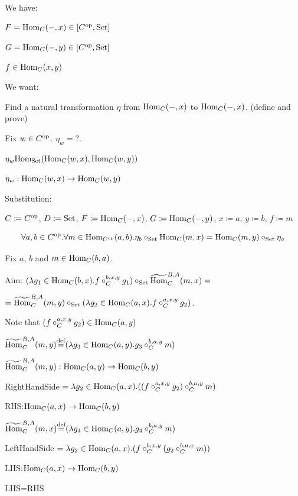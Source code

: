 \documentclass[10pt,a4paper]{article}
\begin{document}
\begin{Lemma}$\textrm{ }$

We have:

$F={\textrm{Hom}}_C(-,x)\in [C^{\textrm{op}},{\textrm{Set}}]$

$G={\textrm{Hom}}_C(-,y)\in [C^{\textrm{op}},{\textrm{Set}}]$

$f\in{\textrm{Hom}}_C(x,y)$

We want:

Find a natural transformation $\eta$ from ${\textrm{Hom}}_C(-,x)$ to ${\textrm{Hom}}_C(-,x)$.
 (define and prove)

\end{Lemma}
Fix $w\in C^{\textrm{op}}$. $\eta_w = ?$.

$\eta_w{\textrm{Hom}}_{\textrm{Set}}({\textrm{Hom}}_C(w,x),{\textrm{Hom}}_C(w,y))$

$\eta_w: {\textrm{Hom}}_C(w,x)\to {\textrm{Hom}}_C(w,y)$


Substitution:

$C \coloneqq C^{\textrm{op}}$, $D \coloneqq {\textrm{Set}}$, $F \coloneqq {\textrm{Hom}}_C(-,x)$, $G \coloneqq {\textrm{Hom}}_C(-,y)$, $x \coloneqq a$, $y \coloneqq b$, $f \coloneqq m$
\begin{Lemma}
$$\forall a,b\in C^{\textrm{op}}. \forall m\in {\textrm{Hom}}_{C^{\textrm{op}}}(a,b).\eta_b \circ_{\textrm{Set}} {\textrm{Hom}}_C(m,x)={\textrm{Hom}}_C(m,y)\circ_{\textrm{Set}}\eta_a$$
\end{Lemma}
\myprf

Fix $a$, $b$ and $m\in{\textrm{Hom}}_C(b,a)$.

Aim: $(\lambda g_1 \in {\textrm{Hom}}_C(b,x). f\circ^{b,x,y}_C g_1)\circ_{\textrm{Set}} {\widetilde{{\textrm{Hom}}}\textrm{}}_C^{B,A}(m,x) = $

$={\widetilde{{\textrm{Hom}}}\textrm{}}_C^{B,A}(m,y) \circ_{\textrm{Set}} (\lambda g_2 \in {\textrm{Hom}}_C(a,x). f\circ^{a,x,y}_C g_2)$.

Note that $(f\circ^{a,x,y}_C g_2) \in {\textrm{Hom}}_C(a,y)$

${\widetilde{{\textrm{Hom}}}\textrm{}}_C^{B,A}(m,y) {\stackrel{{\textrm{def}}}{=}} (\lambda g_3 \in {\textrm{Hom}}_C(a,y). g_3\circ^{b,a,y}_C m)$

${\widetilde{{\textrm{Hom}}}\textrm{}}_C^{B,A}(m,y) : {\textrm{Hom}}_C(a,y) \to {\textrm{Hom}}_C(b,y)$

RightHandSide $= \lambda g_2 \in {\textrm{Hom}}_C(a,x). ((f \circ_C^{a,x,y} g_2) \circ_C^{b,a,y} m )$

RHS:${\textrm{Hom}}_C(a,x) \to {\textrm{Hom}}_C(b,y)$

${\widetilde{{\textrm{Hom}}}\textrm{}}_C^{B,A}(m,x) {\stackrel{{\textrm{def}}}{=}} (\lambda g_4 \in {\textrm{Hom}}_C(a,y). g_4\circ^{b,a,y}_C m)$

LeftHandSide $= \lambda g_2 \in {\textrm{Hom}}_C(a,x). (f \circ_C^{b,x,y} (g_2 \circ_C^{b,a,x} m ))$

LHS:${\textrm{Hom}}_C(a,x) \to {\textrm{Hom}}_C(b,y)$

LHS=RHS
\end{document}
